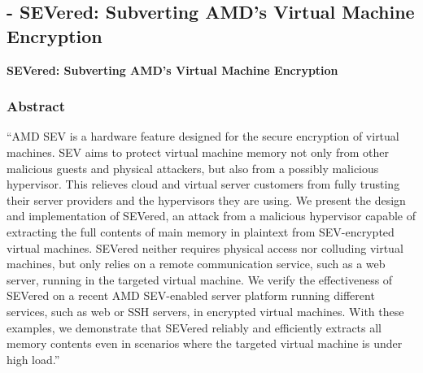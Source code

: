 
\subsection{\cite{morbitzer_severed_2018} - SEVered: Subverting AMD’s Virtual Machine Encryption}

\textbf{SEVered: Subverting AMD’s Virtual Machine Encryption}

\subsubsection*{Abstract \cite{morbitzer_severed_2018}}
“AMD SEV is a hardware feature designed for the secure encryption of virtual machines. SEV aims to protect virtual machine memory not only from other malicious guests and physical attackers, but also from a possibly malicious hypervisor. This relieves cloud and virtual server customers from fully trusting their server providers and the hypervisors they are using. We present the design and implementation of SEVered, an attack from a malicious hypervisor capable of extracting the full contents of main memory in plaintext from SEV-encrypted virtual machines. SEVered neither requires physical access nor colluding virtual machines, but only relies on a remote communication service, such as a web server, running in the targeted virtual machine. We verify the effectiveness of SEVered on a recent AMD SEV-enabled server platform running different services, such as web or SSH servers, in encrypted virtual machines. With these examples, we demonstrate that SEVered reliably and efficiently extracts all memory contents even in scenarios where the targeted virtual machine is under high load.” 

